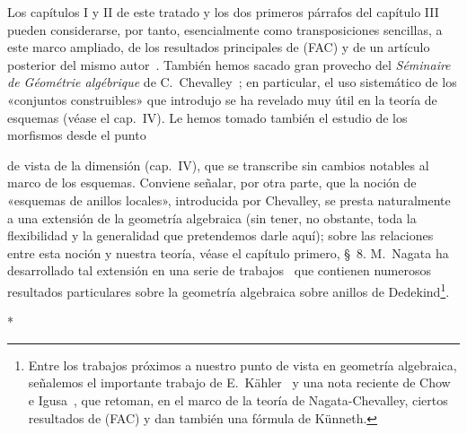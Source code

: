 Los capítulos I y II de este tratado y los dos primeros párrafos del capítulo III pueden considerarse, por tanto, esencialmente como transposiciones sencillas, a este marco ampliado, de los resultados principales de (FAC) y de un artículo posterior del mismo autor~\cite{I-15}.
También hemos sacado gran provecho del \emph{Séminaire de Géométrie algébrique} de C.~Chevalley~\cite{I-1}; en particular, el uso sistemático de los «conjuntos construibles» que introdujo se ha revelado muy útil en la teoría de esquemas (véase el cap.~IV).
Le hemos tomado también el estudio de los morfismos desde el punto

de vista de la dimensión (cap.~IV), que se transcribe sin cambios notables al marco de los esquemas.
Conviene señalar, por otra parte, que la noción de «esquemas de anillos locales», introducida por Chevalley, se presta naturalmente a una extensión de la geometría algebraica (sin tener, no obstante, toda la flexibilidad y la generalidad que pretendemos darle aquí); sobre las relaciones entre esta noción y nuestra teoría, véase el capítulo primero, \S~8.
M.~Nagata ha desarrollado tal extensión en una serie de trabajos~\cite{I-9} que contienen numerosos resultados particulares sobre la geometría algebraica sobre anillos de Dedekind\footnote{Entre los trabajos próximos a nuestro punto de vista en geometría algebraica, señalemos el importante trabajo de E.~Kähler~\cite{I-22} y una nota reciente de Chow e Igusa~\cite{I-3}, que retoman, en el marco de la teoría de Nagata-Chevalley, ciertos resultados de (FAC) y dan también una fórmula de Künneth.}.

\bigskip
\begin{center}*\quad*\quad*\end{center}
\bigskip
